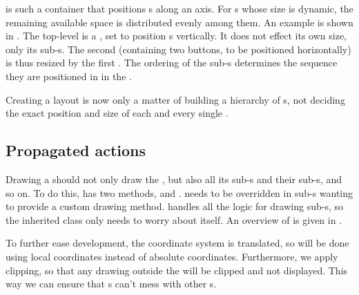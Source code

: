  is such a container  that positions
s along an axis. For s whose size is dynamic,
the remaining available space is distributed evenly among them. An example is
shown in . The top-level  is a
, set to position s vertically. It does
not effect its own size, only its sub-s. The second
 (containing two buttons, to be positioned
horizontally) is thus resized by the first . The
ordering of the sub-s determines the sequence they are
positioned in in the .


Creating a layout is now only a matter of building a hierarchy of
s, not deciding the exact position and size of each and every
single .

\subsection{Propagated actions}
\label{sec:actions}

Drawing a  should not only draw the , but also
all its sub-s and their sub-s, and so on. To do this,
 has two methods,  and .
 needs to be overridden in sub-s 
wanting to provide a custom drawing method.  handles all the logic
for drawing sub-s, so the inherited class only needs to worry
about itself. An overview of  is given in
.



To further ease development, the coordinate system is translated, so
 will be done using local coordinates instead of absolute
coordinates.  Furthermore, we apply clipping, so that any drawing outside the
 will be clipped and not displayed. This way we can ensure that
s can't mess with other s.

